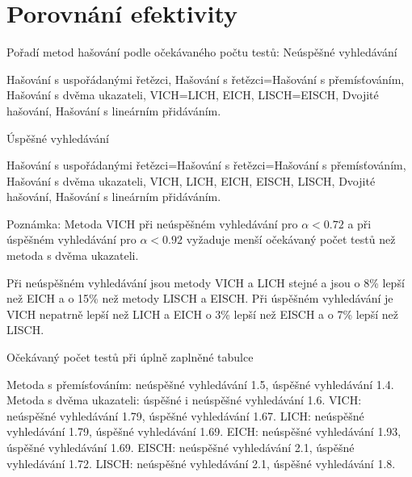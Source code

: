 \documentclass[a4paper,12pt]{article}
\begin{document}
\section{Porovnání efektivity}

Pořadí metod hašování podle očekávaného počtu 
testů:
\subhead
Neúspěšné vyhledávání
\endsubhead

\phantom{---}Hašování s uspořádanými řetězci,\newline 
\phantom{---}Hašování s řetězci=Hašování s přemís\v továním,\newline 
\phantom{---}Hašování s dvěma ukazateli,\newline 
\phantom{---}VICH=LICH,\newline 
\phantom{---}EICH,\newline 
\phantom{---}LISCH=EISCH,\newline 
\phantom{---}Dvojité hašování,\newline 
\phantom{---}Hašování s lineárním přidáváním.

\subhead
\'Uspěšné vyhledávání
\endsubhead

\phantom{---}Hašování s uspořádanými řetězci=Hašování s 
řetězci=Hašo\-vá\-ní s přemís\v továním,\newline 
\phantom{---}Hašování s dvěma ukazateli,\newline 
\phantom{---}VICH,\newline 
\phantom{---}LICH,\newline 
\phantom{---}EICH,\newline 
\phantom{---}EISCH,\newline 
\phantom{---}LISCH,\newline 
\phantom{---}Dvojité hašování,\newline 
\phantom{---}Hašování s lineárním přidáváním.

Poznámka: Metoda VICH při neúspěšném vyhledávání pro 
$\alpha <0.72$ a při úspěšném vy\-hledávání pro $
\alpha <0.92$ 
vyžaduje menší očekávaný počet testů než 
metoda s dvěma ukazateli.

Při neúspěšném vyhledávání jsou metody VICH a LICH stejné a jsou o 8\% lepší než 
EICH a o 15\% než metody LISCH a EISCH. Při úspěšném vyhledávání 
je VICH nepatrně lepší než LICH a EICH o 3\% lepší než 
EISCH a o 7\% lepší než LISCH.

\subhead
Očekávaný počet testů při úplně zaplněné 
tabulce
\endsubhead

\phantom{---}Metoda s přemís\v továním: neúspěšné vyhledávání 1.5, úspěšné 
vyhledávání 1.4.\newline 
\phantom{---}Metoda s dvěma ukazateli: úspěšné i neúspěšné vyhledávání  1.6.\newline 
\phantom{---}VICH: neúspěšné vyhledávání 1.79, úspěšné vyhledávání 
1.67.\newline 
\phantom{---}LICH: neúspěšné vyhledávání 1.79, úspěšné vyhledávání 
1.69.\newline 
\phantom{---}EICH: neúspěšné vyhledávání 1.93, úspěšné vyhledávání 
1.69.\newline 
\phantom{---}EISCH: neúspěšné vyhledávání 2.1, úspěšné vyhledávání 
1.72.\newline 
\phantom{---}LISCH: neúspěšné vyhledávání 2.1, úspěšné vyhledávání 
1.8.
\end{document}
